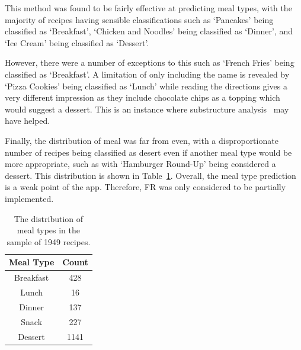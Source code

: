 This method was found to be fairly effective at predicting meal types, with the majority of recipes having sensible
classifications such as \enquote*{Pancakes} being classified as \enquote*{Breakfast}, \enquote*{Chicken and Noodles} being
classified as \enquote*{Dinner}, and \enquote*{Ice Cream} being classified as \enquote*{Dessert}.

However, there were a number of exceptions to this such as \enquote*{French Fries} being classified as \enquote*{Breakfast}.
A limitation of only including the name is revealed by \enquote*{Pizza Cookies} being classified as \enquote*{Lunch}
while reading the directions gives a very different impression as they include chocolate chips as a topping which would
suggest a dessert. This is an instance where substructure analysis~\cite{wang_substructure_2008} may have helped.

Finally, the distribution of meal was far from even, with a disproportionate number of recipes being classified as
desert even if another meal type would be more appropriate, such as with \enquote*{Hamburger Round-Up} being considered
a dessert. This distribution is shown in Table~\ref{tab:meal_type_distribution}. Overall, the meal type prediction
is a weak point of the app. Therefore, FR was only considered to be partially implemented.

\begin{table}[h!]
  \centering
  \caption{\label{tab:meal_type_distribution}The distribution of meal types in the sample of 1949 recipes.}
  \begin{tabular}{cc}\toprule
    \textbf{Meal Type} & \textbf{Count} \\\midrule
    Breakfast&428\\
    Lunch&16\\
    Dinner&137\\
    Snack&227\\
    Dessert&1141\\
  \end{tabular}
\end{table}
